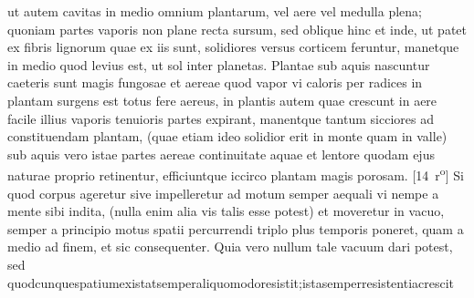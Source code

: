 ut 
autem cavitas in medio omnium plantarum, vel aere vel medulla plena; quoniam partes vaporis non plane recta sursum, sed oblique hinc et inde, ut patet ex fibris lignorum quae ex iis sunt, solidiores versus corticem feruntur, manetque in medio quod levius est, ut sol inter planetas.
Plantae 
sub aquis nascuntur caeteris sunt magis fungosae et aereae quod vapor vi caloris per radices in plantam surgens est totus fere aereus, in plantis autem quae crescunt in aere facile illius vaporis
tenuioris partes expirant, manentque tantum sicciores ad constituendam plantam,
(quae etiam ideo solidior erit in monte quam in valle)
sub aquis vero istae partes aereae continuitate aquae et lentore quodam ejus naturae proprio retinentur, efficiuntque iccirco plantam magis
porosam.
[14~r\textsuperscript{o}]
\pend%
\pstart%
Si quod corpus ageretur sive impelleretur ad motum semper aequali vi nempe a mente sibi indita, (nulla enim alia vis talis esse potest) et moveretur in vacuo, semper a principio motus
spatii percurrendi triplo plus temporis poneret, quam a medio ad finem, et sic consequenter. Quia vero nullum tale vacuum dari potest, sed quodcunque\hfill spatium\hfill existat\hfill semper\hfill aliquo\hfill modo\hfill resistit;\hfill ista\hfill semper\hfill resistentia\hfill crescit
\pend
\newpage
\pstart%
\noindent%
\centering%

